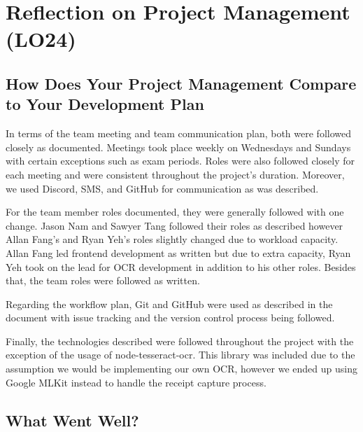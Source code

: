\documentclass{article}
\begin{document}
\section{Reflection on Project Management (LO24)}


\subsection{How Does Your Project Management Compare to Your Development Plan}


In terms of the team meeting and team communication plan, both were followed closely as documented.
Meetings took place weekly on Wednesdays and Sundays with certain exceptions such as exam periods. Roles were
also followed closely for each meeting and were consistent throughout the project's duration. Moreover, we used Discord,
SMS, and GitHub for communication as was described.

For the team member roles documented, they were generally followed with one change. Jason Nam and Sawyer Tang
followed their roles as described however Allan Fang's and Ryan Yeh's roles slightly changed due to workload capacity.
Allan Fang led frontend development as written but due to extra capacity, Ryan Yeh took on the lead for OCR development in addition
to his other roles. Besides that, the team roles were followed as written.

Regarding the workflow plan, Git and GitHub were used as described in the document with issue tracking and the
version control process being followed.

Finally, the technologies described were followed throughout the project with the exception of the usage of
node-tesseract-ocr. This library was included due to the assumption we would be implementing our own OCR, however
we ended up using Google MLKit instead to handle the receipt capture process.

\subsection{What Went Well?}

\end{document}
